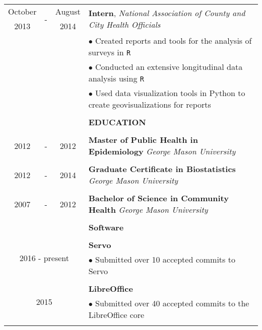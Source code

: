 \documentclass[10pt]{article}
\begin{document}
\begin{table}[ht]
\begin{tabular}{@{\hspace{0mm}}c@{\hspace{1mm}}c@{\hspace{3mm}}cl}
            October & \multirow{2}{*}{-} & August & \multirow{2}{*}{\textbf{Intern}, \textit{National Association of County and City Health Officials}}\\
            2013 & & 2014 &\\
            & & & $\bullet$ Created reports and tools for the analysis of surveys in \texttt{R}\\
            & & & $\bullet$ Conducted an extensive longitudinal data analysis using \texttt{R}\\
            & & & $\bullet$ Used data visualization tools in Python to create geovisualizations for reports\\
            & & & \color{maroon}{\rule{14cm}{0.75pt}}\\
            & & & \large{\textbf{EDUCATION}}\\
            & & & \color{maroon}{\rule{14cm}{0.75pt}}\\
            2012 & - & 2012 & \textbf{Master of Public Health in Epidemiology} \textit{George Mason University}\\
            \\
            2012 & - & 2014 & \textbf{Graduate Certificate in Biostatistics} \textit{George Mason University}\\
            \\
            2007 & - & 2012 & \textbf{Bachelor of Science in Community Health} \textit{George Mason University}\\
            & & & \color{maroon}{\rule{14cm}{0.75pt}}\\
            & & & \large{\textbf{Software}}\\
            & & & \color{maroon}{\rule{14cm}{0.75pt}}\\
            \multicolumn{3}{c}{\multirow{2}{*}{2016 - present}} & \textbf{Servo}\\
            & & & $\bullet$ Submitted over 10 accepted commits to Servo\\
            \\
            \multicolumn{3}{c}{\multirow{2}{*}{2015}} & \textbf{LibreOffice}\\
            & & & $\bullet$ Submitted over 40 accepted commits to the LibreOffice core\\
            \\

\end{tabular}
\end{table}
\end{document}
